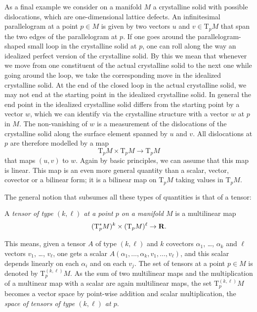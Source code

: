 As a final example we consider on a manifold $M$ a crystalline solid
with possible dislocations, which are one-dimensional lattice defects. An
infinitesimal parallelogram at a point $p \in M$ is given by two vectors
$u$ and $v \in \mathrm T_p M$ that span the two edges of the parallelogram at
$p$. If one goes around the parallelogram-shaped small loop in the crystalline
solid at $p$, one can roll along the way an idealized perfect version of the
crystalline solid. By this we mean that whenever we move from one
constituent of the actual crystalline solid to the next one while going around
the loop, we take the corresponding move in the idealized crystalline solid. At
the end of the closed loop in the actual crystalline solid, we may not end at
the starting point in the idealized crystalline solid. In general the end point
in the idealized crystalline solid differs from the starting point by a vector
$w$, which we can identify via the crystalline structure with a vector $w$
at $p$ in $M$. The non-vanishing of $w$ is a measurement of the dislocations of
the crystalline solid along the surface element spanned by $u$ and $v$. All
dislocations at $p$ are therefore modelled by a map
\[
  \mathrm T_p M \times \mathrm T_p M \to \mathrm T_p M
\]
that maps $(u, v)$ to $w$. Again by basic principles, we can assume that this
map is linear. This map is an even more general quantity than a scalar, vector,
covector or a bilinear form; it is a bilinear map on $\mathrm T_p M$ taking
values in $\mathrm T_p M$.

The general notion that subsumes all these types of quantities is that of a
tensor:

\begin{dfn}
  A \emph{tensor of type $(k, \ell)$ at a point $p$ on a manifold $M$} is a
  multilinear map
  \[
    (\mathrm T^*_p M)^k \times (\mathrm T_p M)^\ell \to \mathbf{R}.
  \] 
\end{dfn}
This means, given a tensor $A$ of type $(k, \ell)$ and $k$ covectors
$\alpha_1$, \dots, $\alpha_k$ and $\ell$ vectors $v_1$, \dots, $v_\ell$, one
gets a scalar $A(\alpha_1, \dotsc, \alpha_k, v_1, \dotsc, v_\ell)$, and this
scalar depends linearly on each $\alpha_i$ and on each $v_j$. The set of
tensors at a point $p \in M$ is denoted by $\mathrm T^{(k, \ell)}_p M$. As the
sum of two multilinear maps and the multiplication of a multinear map with a
scalar are again multilinear maps, the set $\mathrm T^{(k, \ell)}_p M$ becomes
a vector space by point-wise addition and scalar multiplication, the \emph{space
of tensors of type $(k, \ell)$ at $p$}.

